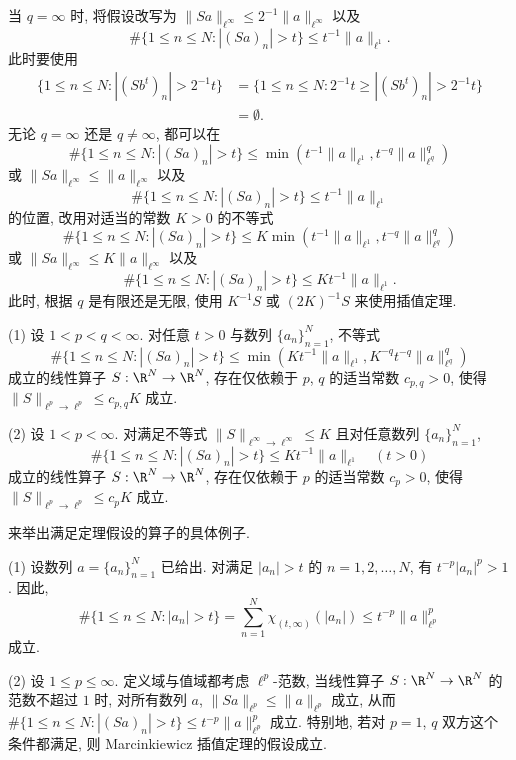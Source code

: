 当 $q = \infty$ 时, 将假设改写为 $\|Sa\|_{\ell^{\infty}} \leq 2^{-1}\|a\|_{\ell^{\infty}}$ 以及
\[
\# \{1 \leq n \leq N : |(Sa)_{n}| > t\} \leq t^{-1}\|a\|_{\ell^{1}}.
\]
此时要使用
\begin{align*}
\{1 \leq n \leq N : |(Sb^{t})_{n}| > 2^{-1}t\} & = \{1 \leq n \leq N : 2^{-1}t \geq |(Sb^{t})_{n}| > 2^{-1}t\} \\
& = \emptyset.
\end{align*}
无论 $q = \infty$ 还是 $q \neq \infty$, 都可以在
\[
\# \{1 \leq n \leq N : |(Sa)_{n}| > t\} \leq \min(t^{-1}\|a\|_{\ell^{1}}, t^{-q}\|a\|_{\ell^{q}}^{q})
\]
或 $\|Sa\|_{\ell^{\infty}} \leq \|a\|_{\ell^{\infty}}$ 以及
\[
\# \{1 \leq n \leq N : |(Sa)_{n}| > t\} \leq t^{-1}\|a\|_{\ell^{1}}
\]
的位置, 改用对适当的常数 $K > 0$ 的不等式
\[
\# \{1 \leq n \leq N : |(Sa)_{n}| > t\} \leq K\min(t^{-1}\|a\|_{\ell^{1}}, t^{-q}\|a\|_{\ell^{q}}^{q})
\]
或 $\|Sa\|_{\ell^{\infty}} \leq K\|a\|_{\ell^{\infty}}$ 以及
\[
\# \{1 \leq n \leq N : |(Sa)_{n}| > t\} \leq Kt^{-1}\|a\|_{\ell^{1}}.
\]
此时, 根据 $q$ 是有限还是无限, 使用 $K^{-1}S$ 或 $(2K)^{-1}S$ 来使用插值定理.

\begin{theorem}\label{thm:1.5}
(1) 设 $1 < p < q < \infty$. 对任意 $t > 0$ 与数列 $\{a_{n}\}_{n=1}^{N}$, 不等式
\[
\# \{1 \leq n \leq N : |(Sa)_{n}| > t\} \leq \min(Kt^{-1}\|a\|_{\ell^{1}}, K^{-q}t^{-q}\|a\|_{\ell^{q}}^{q})
\]
成立的线性算子 $S: \R^{N} \to \R^{N}$, 存在仅依赖于 $p$, $q$ 的适当常数 $c_{p,q} > 0$, 使得 $\|S\|_{\ell^{p} \to \ell^{p}} \leq c_{p,q}K$ 成立.

(2) 设 $1 < p < \infty$. 对满足不等式 $\|S\|_{\ell^{\infty} \to \ell^{\infty}} \leq K$ 且对任意数列 $\{a_{n}\}_{n=1}^{N}$,
\[
\# \{1 \leq n \leq N : |(Sa)_{n}| > t\} \leq Kt^{-1}\|a\|_{\ell^{1}} \quad (t > 0)
\]
成立的线性算子 $S: \R^{N} \to \R^{N}$, 存在仅依赖于 $p$ 的适当常数 $c_{p} > 0$, 使得 $\|S\|_{\ell^{p} \to \ell^{p}} \leq c_{p}K$ 成立.
\end{theorem}

来举出满足定理假设的算子的具体例子.

\begin{example}\label{exa:1.8}
(1) 设数列 $a = \{a_{n}\}_{n=1}^{N}$ 已给出. 对满足 $|a_{n}| > t$ 的 $n = 1, 2, \ldots, N$, 有 $t^{-p}|a_{n}|^{p} > 1$. 因此,
\[
\# \{1 \leq n \leq N : |a_{n}| > t\} = \sum_{n=1}^{N} \chi_{(t,\infty)}(|a_{n}|) \leq t^{-p}\|a\|_{\ell^{p}}^{p}
\]
成立.

(2) 设 $1 \leq p \leq \infty$. 定义域与值域都考虑 $\ell^{p}$-范数, 当线性算子 $S: \R^{N} \to \R^{N}$ 的范数不超过 $1$ 时, 对所有数列 $a$, $\|Sa\|_{\ell^{p}} \leq \|a\|_{\ell^{p}}$ 成立, 从而 $\# \{1 \leq n \leq N : |(Sa)_{n}| > t\} \leq t^{-p}\|a\|_{\ell^{p}}^{p}$ 成立. 特别地, 若对 $p = 1$, $q$ 双方这个条件都满足, 则 Marcinkiewicz 插值定理的假设成立.
\end{example}

